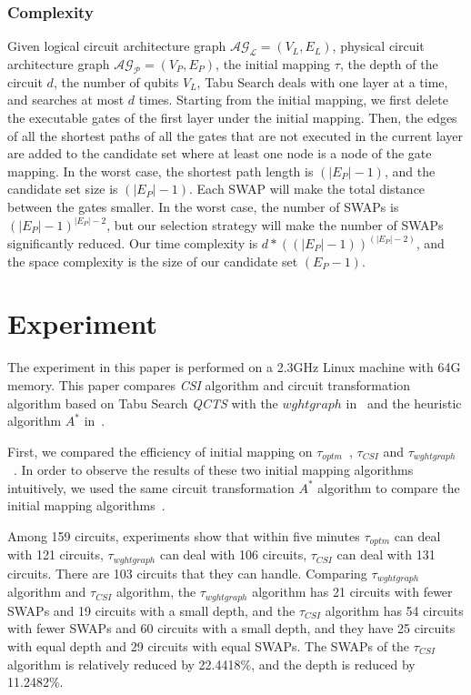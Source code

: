 \documentclass[runningheads]{llncs}
\begin{document}
\subsubsection{Complexity}
Given logical circuit architecture graph  $\mathcal{AG_{L}}=(V_{L},E_{L})$, physical circuit architecture graph $\mathcal{AG_{P}}=(V_{P},E_{P})$, the initial mapping $\tau$, the depth of the circuit $d$, the number of qubits $V_{L}$, Tabu Search deals with one layer at a time, and searches at most $d$ times. Starting from the initial mapping, we first delete the executable gates of the first layer under the initial mapping. Then, the edges of all the shortest paths of all the gates that are not executed in the current layer are added to the candidate set where at least one node is a node of the gate mapping. In the worst case, the shortest path length is $(|E_{P}|-1)$, 
and the candidate set size is $(|E_{P}|-1)$. Each SWAP will make the total distance between the gates smaller. In the worst case, the number of SWAPs is $(|E_{P}|-1)^{|E_{P}|-2}$, but our selection strategy will make the number of SWAPs significantly reduced. Our time complexity is $d*((|E_{P}|-1))^{(|E_{P}|-2)}$, and the space complexity is the size of our candidate set $(E_{P}-1)$.
\section{Experiment}
\label{Experiment}
The experiment in this paper is performed on a 2.3GHz Linux machine with 64G memory. This paper compares  \textit{CSI}  algorithm 
and circuit transformation algorithm based on Tabu Search \textit{QCTS} with the $wghtgraph$ in~\cite{2020Qubit} and the heuristic algorithm $ A^{*}$  in~\cite{Zulehner2017}.
 
First, we compared the efficiency of initial mapping on $\tau_{optm}$~\cite{Zulehner2017},  $\tau_{CSI}$ and $\tau_{wghtgraph}$~\cite{2020Qubit}. In order to observe the results of these two initial mapping algorithms intuitively, we used the same circuit transformation $ A^{*}$ algorithm to compare the initial mapping algorithms~\cite{Zulehner2017}.

Among 159 circuits, experiments show that within five minutes $\tau_{optm}$ can deal with 121 circuits, $\tau_{wghtgraph}$  can deal with 106 circuits, $\tau_{CSI}$  can deal with  131 circuits. There are 103 circuits that they can handle. Comparing $\tau_{wghtgraph}$ algorithm and $\tau_{CSI}$ algorithm, the $\tau_{wghtgraph}$ algorithm has 21 circuits with fewer SWAPs and 19 circuits with a small depth, and the $\tau_{CSI}$ algorithm has 54 circuits with fewer SWAPs and 60 circuits with a small depth, and they have 25 circuits with equal depth and  29 circuits with equal SWAPs. The SWAPs of the $\tau_{CSI}$ algorithm is relatively reduced by 22.4418\%, 
and the depth is reduced by 11.2482\%.
\end{document}
